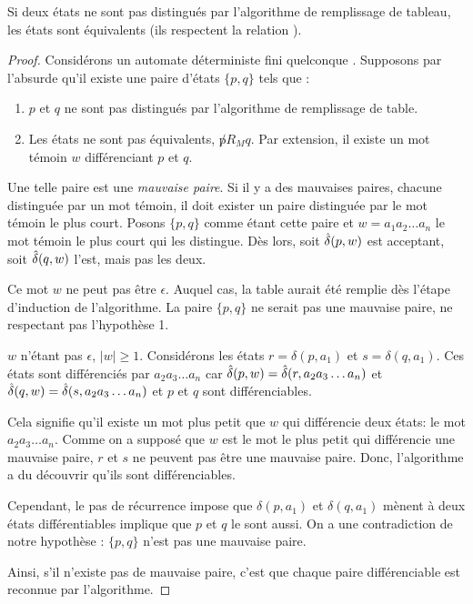 	 \begin{theorem}
	 	Si deux états ne sont pas distingués par l'algorithme de remplissage de tableau, les états sont équivalents (ils respectent la relation \rm).
	 \end{theorem}
	 
	 \begin{proof}
	 	
	 Considérons un automate déterministe fini quelconque \automaton. Supposons par l'absurde qu'il existe une paire d'états $\{p,q\}$ tels que :
	 \begin{enumerate}
	 		\item $p$ et $q$ ne sont pas distingués par l'algorithme de remplissage de table.
	 		\item Les états ne sont pas équivalents, $\not pR_M q$. Par extension, il existe un mot témoin $w$ différenciant $p$ et $q$.
	 \end{enumerate}
	 	
	 Une telle paire est une \emph{mauvaise paire}. Si il y a des mauvaises paires, chacune distinguée par un mot témoin, il doit exister un paire distinguée par le mot témoin le plus court. Posons $\{p,q\}$ comme étant cette paire et $w=a_1a_2\dots a_n$ le mot témoin le plus court qui les distingue. Dès lors, soit $\hat{\delta}(p,w)$ est acceptant, soit $\hat{\delta}(q,w)$ l'est, mais pas les deux.
	 	
	 Ce mot $w$ ne peut pas être $\epsilon$. Auquel cas, la table aurait été remplie dès l'étape d'induction de l'algorithme. La paire $\{p,q\}$ ne serait pas une mauvaise paire, ne respectant pas l'hypothèse 1.
	 
	 $w$ n'étant pas $\epsilon$, $ |w| \ge 1$. Considérons les états $r = \delta(p,a_1)$ et $s=\delta(q,a_1)$. Ces états sont différenciés par $a_2a_3\dots a_n$ car $\hat{\delta}(p,w) = \hat{\delta}(r, a_2a_3\dots a_n)$ et $\hat{\delta}(q,w) = \hat{\delta}(s, a_2a_3\dots a_n)$ et $p$ et $q$ sont différenciables.
	 
	 Cela signifie qu'il existe un mot plus petit que $w$ qui différencie deux états: le mot $a_2a_3\dots a_n$. Comme on a supposé que $w$ est le mot le plus petit qui différencie une mauvaise paire, $r$ et $s$ ne peuvent pas être une mauvaise paire. Donc, l'algorithme a du découvrir qu'ils sont différenciables.
	 	
	 Cependant, le pas de récurrence impose que $\delta(p, a_1)$ et $\delta(q, a_1)$ mènent à deux états différentiables implique que $p$ et $q$ le sont aussi. On a une contradiction de notre hypothèse : $\{p,q\}$ n'est pas une mauvaise paire.
	 
	 Ainsi, s'il n'existe pas de mauvaise paire, c'est que chaque paire différenciable est reconnue par l'algorithme.
	 \end{proof}
	 
